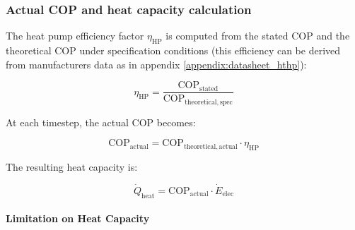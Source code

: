 \documentclass[11pt,a4paper]{report}
\begin{document}
\subsubsection{Actual COP and heat capacity calculation}

The heat pump efficiency factor $\eta_{\mathrm{HP}}$ is computed from the stated COP and the theoretical COP under specification conditions (this efficiency can be derived from manufacturers data as in appendix \ref{appendix:datasheet_hthp}):

\begin{equation}
\eta_{\mathrm{HP}} =
\frac{\mathrm{COP}_{\mathrm{stated}}}{\mathrm{COP}_{\mathrm{theoretical,spec}}}
\end{equation}

At each timestep, the actual COP becomes:

\begin{equation}
\mathrm{COP}_{\mathrm{actual}} =
\mathrm{COP}_{\mathrm{theoretical,actual}} \cdot \eta_{\mathrm{HP}}
\end{equation}

The resulting heat capacity is:

\begin{equation}
\dot{Q}_{\mathrm{heat}} =
\mathrm{COP}_{\mathrm{actual}} \cdot \dot{E}_{\mathrm{elec}}
\end{equation}

\paragraph*{Limitation on Heat Capacity}
\end{document}
